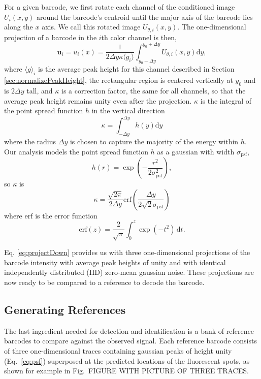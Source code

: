   For a given barcode, we first rotate each channel of the  conditioned image $U_i(x,y)$ around the barcode's centroid until the major axis of the barcode lies along the $x$ axis. We call this rotated image  $U_{\theta,i}(x,y)$. The one-dimensional projection of a barcode in the $i$th color channel is then, 
\begin{equation}\label{eq:projectDown}
	   \mathbf{u}_i=u_i(x)=\frac{1}{2 \Delta y \kappa\langle g_i \rangle}  \int_{y_0 - \Delta y}^{y_0+\Delta y} { {U_{\theta,i}(x,y) \mathrm{d}y} },
\end{equation}
where $\langle g \rangle_i$ is the average peak height for this channel described in Section \ref{sec:normalizePeakHeight}, the rectangular region is centered vertically at $y_0$ and is $2\Delta y$ tall, and $\kappa$ is a correction factor, the same for all channels, so that the average peak height remains unity even after the projection. $\kappa$ is the integral of the point spread function $h$ in the vertical direction
\begin{equation}
	\kappa=\int_{-\Delta y}^{\Delta y} h(y) \mathrm{d}y
\end{equation}
where the radius $\Delta y$ is chosen to capture the majority of the energy within $h$. Our analysis models the point spread function $h$ as a gaussian with width $\sigma_{\text{psf}}$,
\begin{equation}\label{eq:psf}
h(r)=\exp \left(  -\frac{r^2}{2\sigma_{\text{psf}}^2} \right),
\end{equation}
so $\kappa$ is
\begin{equation}
\kappa = \frac{\sqrt{2\pi}} {2 \Delta y} \text{erf} \left(\frac{\Delta y}{2\sqrt{2}\sigma_{\text{psf}}} \right)
\end{equation}
where $\text{erf}$ is the error function \citep{reif_fundamentals_1965}
\begin{equation}
\text{erf}(z) = \frac{2}{\sqrt{\pi}} \int_0^z \exp (-t^2) \, \mathrm{d}t.
\end{equation}

Eq. \ref{eq:projectDown} provides us with three one-dimensional projections of the barcode intensity with average peak heights of unity and with identical independently distributed (IID) zero-mean gaussian noise. These projections are now ready to be compared to a reference to decode the barcode.

\subsection{Generating References}\label{sec:generateReferences}
The last ingredient needed for detection and identification is a bank of reference barcodes to compare against the observed signal. Each reference barcode consists of three one-dimensional traces containing  gaussian peaks of height unity (Eq.~\ref{eq:psf}) superposed at the predicted locations of the fluorescent spots, as shown for example in Fig.~FIGURE WITH PICTURE OF THREE TRACES. 



